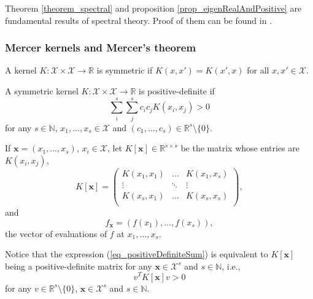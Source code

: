 Theorem \ref{theorem_spectral} and proposition \ref{prop_eigenRealAndPositive} are fundamental results of spectral theory. Proof of them can be found in \textcite{debnath1990}.


\subsubsection{Mercer kernels and Mercer's theorem} \label{sec_mercer}

\begin{definition} \label{def_symmetryKernel}
  A kernel $K: \mathcal{X} \times \mathcal{X} \to \mathbb{R}$ is symmetric if $K(x,x') = K(x',x)$ for all $x,x' \in \mathcal{X}$.
\end{definition}

\begin{definition} \label{def_positiveDefinitenessKernel}
  A symmetric kernel $K: \mathcal{X} \times \mathcal{X} \to \mathbb{R}$ is positive-definite if
  \begin{equation} \label{eq_positiveDefiniteSum}
    \sum_i^s \sum_j^s c_i c_j K(x_i,x_j) > 0 
  \end{equation}
  for any $s \in \mathbb{N}$, $x_1, \dots, x_s \in \mathcal{X}$ and $(c_1, \dots, c_s) \in \mathbb{R}^s \setminus \{0\}$. 
\end{definition}

If $\pmb{x}=(x_1,\dots,x_s)$, $x_i \in \mathcal{X}$, let $K[\pmb{x}] \in \mathbb{R}^{s \times s}$ be the matrix whose entries are $K(x_i,x_j)$,
\begin{equation} \label{eq_Kx} 
  K[\pmb{x}] = 
  \begin{pmatrix}
    K(x_1,x_1) & \dots  & K(x_1,x_s) \\
     \vdots    & \ddots & \vdots     \\
    K(x_s,x_1) & \dots  & K(x_s,x_s) \\
  \end{pmatrix},
\end{equation}
and 
\begin{equation*}
  f_{\pmb{x}} = (f(x_1), \dots, f(x_s)),
\end{equation*}
the vector of evaluations of $f$ at $x_1, \dots, x_s$.

\begin{remark} \label{remark_KxPositiveDefinite}
  Notice that the expression (\ref{eq_positiveDefiniteSum}) is equivalent to $K[\pmb{x}]$ being a positive-definite matrix for any $\pmb{x} \in \mathcal{X}^s$ and $s \in \mathbb{N}$, i.e., 
  \begin{equation*}
    v^T K[\pmb{x}] v > 0 
  \end{equation*}
  for any $v \in \mathbb{R}^s \setminus \{0\}$, $\pmb{x} \in \mathcal{X}^s$ and $s \in \mathbb{N}$.
\end{remark}

